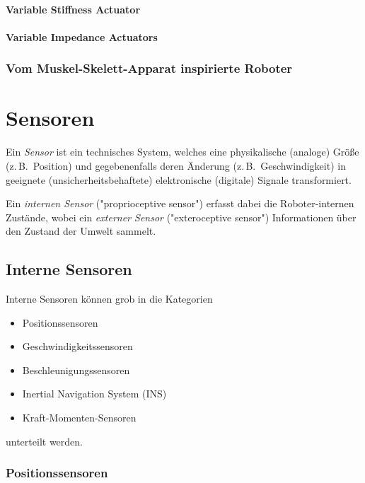 \documentclass[a4paper, 11pt, accentcolor = tud3b]{tudreport}
\newcommand{\zB}{z.\,B.~}
\begin{document}
				\subsubsection{Variable Stiffness Actuator} %

				\subsubsection{Variable Impedance Actuators} %

			\subsection{Vom Muskel-Skelett-Apparat inspirierte Roboter} %

	\chapter{Sensoren}
		Ein \emph{Sensor} ist ein technisches System, welches eine physikalische (analoge) Größe (\zB Position) und gegebenenfalls deren Änderung (\zB Geschwindigkeit) in geeignete (unsicherheitsbehaftete) elektronische (digitale) Signale transformiert.
		
		Ein \emph{internen Sensor} ("proprioceptive sensor") erfasst dabei die Roboter-internen Zustände, wobei ein \emph{externer Sensor} ("exteroceptive sensor") Informationen über den Zustand der Umwelt sammelt.
	
		\section{Interne Sensoren}
			Interne Sensoren können grob in die Kategorien
			\begin{itemize}
				\item Positionssensoren
				\item Geschwindigkeitssensoren
				\item Beschleunigungssensoren
				\item Inertial Navigation System (INS)
				\item Kraft-Momenten-Sensoren
			\end{itemize}
			unterteilt werden.

			\subsection{Positionssensoren}
\end{document}
